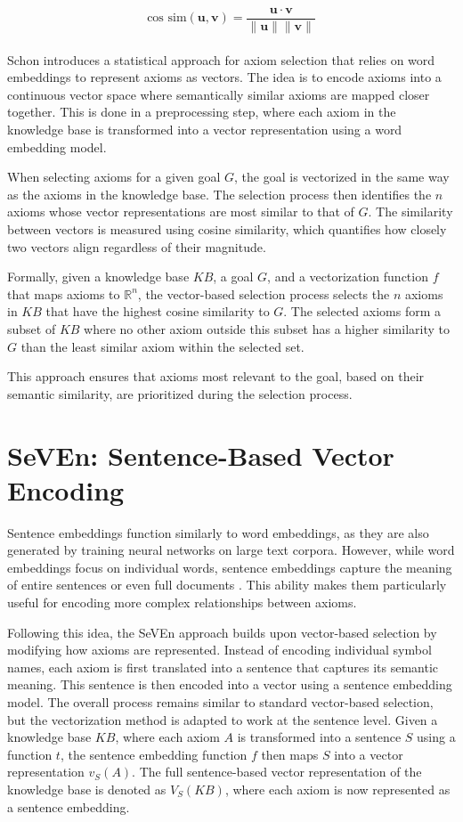 \documentclass[english,version-2020-11]{uzl-thesis}
\begin{document}
\[
\text{cos sim}(\mathbf{u}, \mathbf{v}) = \frac{\mathbf{u} \cdot \mathbf{v}}{\|\mathbf{u}\| \|\mathbf{v}\|}
\]
\\

Schon \cite{Schon2023} introduces a statistical approach for axiom selection that relies on word embeddings to represent axioms as vectors. The idea is to encode axioms into a continuous vector space where semantically similar axioms are mapped closer together. This is done in a preprocessing step, where each axiom in the knowledge base is transformed into a vector representation using a word embedding model.

When selecting axioms for a given goal \( G \), the goal is vectorized in the same way as the axioms in the knowledge base. The selection process then identifies the \( n \) axioms whose vector representations are most similar to that of \( G \). The similarity between vectors is measured using cosine similarity, which quantifies how closely two vectors align regardless of their magnitude.

Formally, given a knowledge base \( KB \), a goal \( G \), and a vectorization function \( f \) that maps axioms to \( \mathbb{R}^n \), the vector-based selection process selects the \( n \) axioms in \( KB \) that have the highest cosine similarity to \( G \). The selected axioms form a subset of \( KB \) where no other axiom outside this subset has a higher similarity to \( G \) than the least similar axiom within the selected set.

This approach ensures that axioms most relevant to the goal, based on their semantic similarity, are prioritized during the selection process.

\section{SeVEn: Sentence-Based Vector Encoding}

Sentence embeddings function similarly to word embeddings, as they are also generated by training neural networks on large text corpora. However, while word embeddings focus on individual words, sentence embeddings capture the meaning of entire sentences or even full documents \cite{Kiros2015SkipThought}. This ability makes them particularly useful for encoding more complex relationships between axioms.

Following this idea, the SeVEn approach builds upon vector-based selection by modifying how axioms are represented. Instead of encoding individual symbol names, each axiom is first translated into a sentence that captures its semantic meaning. This sentence is then encoded into a vector using a sentence embedding model. The overall process remains similar to standard vector-based selection, but the vectorization method is adapted to work at the sentence level. Given a knowledge base \( KB \), where each axiom \( A \) is transformed into a sentence \( S \) using a function \( t \), the sentence embedding function \( f \) then maps \( S \) into a vector representation \( v_S(A) \). The full sentence-based vector representation of the knowledge base is denoted as \( V_S(KB) \), where each axiom is now represented as a sentence embedding.
\end{document}
